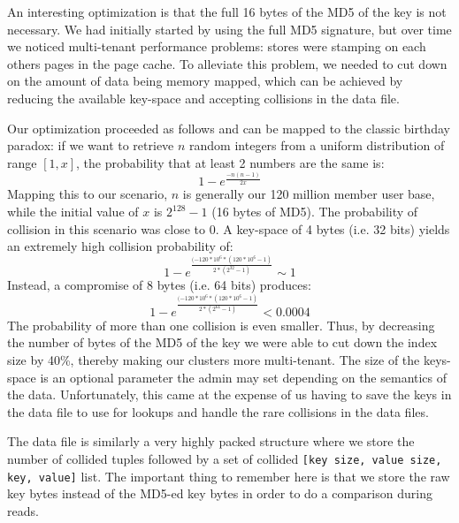 An interesting optimization is that the full 16 bytes of the MD5 of
the key is not necessary. We had initially started by using the full
MD5 signature, but over time we noticed multi-tenant performance
problems: stores were stamping on each others pages in the page cache.
To alleviate this problem, we needed to cut down on the amount of data
being memory mapped, which can be achieved by reducing the available
key-space and accepting collisions in the data file. 

Our optimization proceeded as follows and can be mapped to the classic
birthday paradox: if we want to retrieve $n$ random integers from a
uniform distribution of range $[1, x]$, the probability that at least
2 numbers are the same is:
\begin{equation}
1 - e^{\frac{-n(n-1)}{2x}}
\end{equation}
Mapping this to our scenario, $n$ is generally our 120 million member
user base, while the initial value of $x$ is $2^{128} - 1$ (16 bytes
of MD5). The probability of collision in this scenario was close to 0.
A key-space of 4 bytes (i.e. 32 bits) yields an extremely high
collision probability of:
\begin{equation}
1 - e^{\frac{(-120*10^{6} * (120*10^{6} - 1)}{2 * (2^{32} - 1)}} \sim 1
\end{equation}
Instead, a compromise of 8 bytes (i.e. 64 bits) produces:
\begin{equation} 
1 - e^{\frac{(-120*10^{6} * (120*10^{6} - 1)} { 2 * (2^{64} - 1 )}} < 0.0004
\end{equation}
The probability of more than one collision is even smaller. Thus, by
decreasing the number of bytes of the MD5 of the key we were able to
cut down the index size by 40\%, thereby making our clusters more
multi-tenant. The size of the keys-space is an optional parameter the
admin may set depending on the semantics of the data. Unfortunately,
this came at the expense of us having to save the keys in the data
file to use for lookups and handle the rare collisions in the data
files.

The data file is similarly a very highly packed structure where we
store the number of collided tuples followed by a set of collided
\verb=[key size, value size, key, value]= list. The important thing to
remember here is that we store the raw key bytes instead of the MD5-ed
key bytes in order to do a comparison during reads. 


